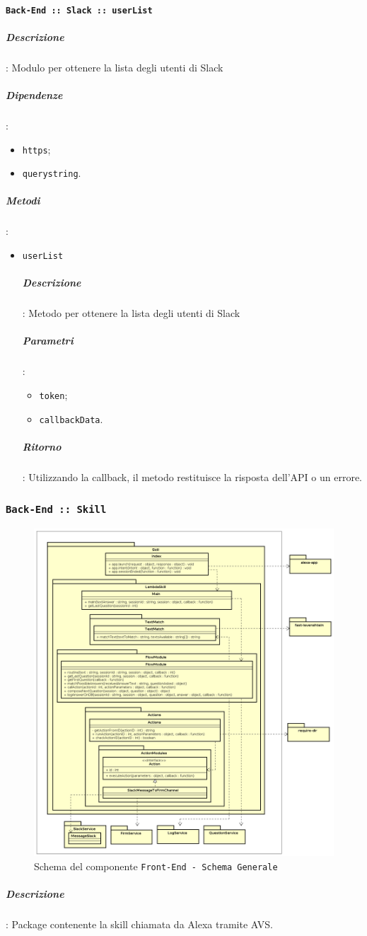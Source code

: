 \documentclass[../DefinizioneDiProdotto_v2.0.0.tex]{subfiles}
\begin{document}
\paragraph{\texttt{Back-End :: Slack :: userList}}
\subparagraph{Descrizione}: Modulo per ottenere la lista degli utenti di Slack
\subparagraph{Dipendenze}:
\begin{itemize}
	\item \texttt{https};
	\item \texttt{querystring}.
\end{itemize}
\subparagraph{Metodi}:
\begin{itemize}
	\item \texttt{userList}
	      \subparagraph{Descrizione}: Metodo per ottenere la lista degli utenti di Slack
	      \subparagraph{Parametri}:
	      \begin{itemize}
	      	\item \texttt{token};
	      	\item \texttt{callbackData}.
	      \end{itemize}
	      \subparagraph{Ritorno}: Utilizzando la callback, il metodo restituisce la risposta dell'API o un errore.
\end{itemize}

\newpage

\subsubsection{\texttt{Back-End :: Skill}}
\begin{figure}[!h]
	\centering
	\includegraphics[width=\textwidth]{Architettura/Back-End/Skill.png}
	\caption{Schema del componente \texttt{Front-End - Schema Generale}}
\end{figure}
\subparagraph{Descrizione}:
Package contenente la skill chiamata da Alexa tramite AVS.
\end{document}
